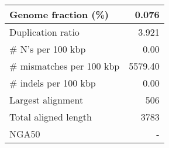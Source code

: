 \documentclass[12pt,a4paper]{article}
\begin{document}
\begin{table}[ht]
\begin{center}
\begin{tabular}{|l*{1}{|r}|}
Genome fraction (\%) & 0.076 \\ \hline
Duplication ratio & 3.921 \\ \hline
\# N's per 100 kbp & 0.00 \\ \hline
\# mismatches per 100 kbp & 5579.40 \\ \hline
\# indels per 100 kbp & 0.00 \\ \hline
Largest alignment & 506 \\ \hline
Total aligned length & 3783 \\ \hline
NGA50 & - \\ \hline
\end{tabular}
\end{center}
\end{table}
\end{document}
